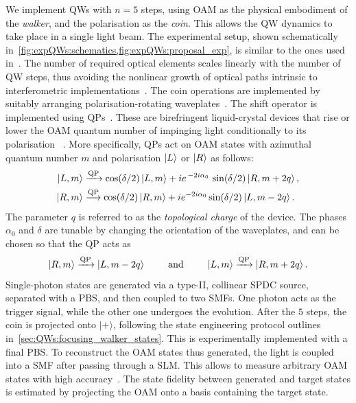 We implement \acp{QW} with $n=5$ steps, using \ac{OAM} as the physical embodiment of the \emph{walker}, and the polarisation as the \emph{coin}. This allows the QW dynamics to take place in a single light beam.
The experimental setup, shown schematically in~\cref{fig:expQWs:schematics,fig:expQWs:proposal_exp}, is similar to the ones used in~\cite{cardano2015quantum,cardano2016statistical}.
The number of required optical elements scales linearly with the number of QW steps, thus avoiding the nonlinear growth of optical paths intrinsic to interferometric implementations~\cite{zhang2010implementation,goyal2013implementing}.
The coin operations are implemented by suitably arranging polarisation-rotating waveplates~\cite{simon1990minimal}. The shift operator is implemented using \acp{QP}~\cite{marrucci2006optical}. These are birefringent liquid-crystal devices that rise or lower the \ac{OAM} quantum number of impinging light conditionally to its polarisation ~\cite{marrucci2006optical}. More specifically, \acp{QP} act on \ac{OAM} states with azimuthal quantum number $m$ and polarisation $\ket L$ or $\ket R$ as follows:
\begin{equation}
\begin{aligned}
	\ket{L,m} & \xrightarrow{\text{QP}} \cos(\delta/2) \ket{L,m}
				+ i e^{\,-2 i \alpha_0}\, \sin(\delta/2) \ket{R,m+2q}, \\
	\ket{R,m} & \stackrel{\text{QP}}{\longrightarrow} \cos(\delta/2) \ket{R,m}
				+ i e^{-2 i \alpha_0} \sin(\delta/2) \ket{L,m-2q}.
\end{aligned}
\end{equation}
The parameter $q$ is referred to as the \emph{topological charge} of the device.
The phases $\alpha_0$ and $\delta$ are tunable by changing the orientation of the waveplates, and can be chosen so that the QP acts as
\begin{equation}
	\ket{R,m}\xrightarrow{\text{QP}} \ket{L,m-2q}
	\qquad\text{ and }\qquad
	\ket{L,m}\xrightarrow{\text{QP}}\ket{R,m+2q}.
\end{equation}
Single-photon states are generated via a type-II, collinear \ac{SPDC} source, separated with a \ac{PBS}, and then coupled to two \acp{SMF}. One photon acts as the trigger signal, while the other one undergoes the evolution.
After the $5$ steps, the coin is projected onto $|+\rangle$, following the state engineering protocol outlines in~\cref{sec:QWs:focusing_walker_states}. This is experimentally implemented with a final \ac{PBS}.
To reconstruct the \ac{OAM} states thus generated, the light is coupled into a \ac{SMF} after passing through a \ac{SLM}. This allows to measure arbitrary \ac{OAM} states with high accuracy~\cite{bolduc2013exact,dambrosio2013test}.
The state fidelity between generated and target states is estimated by projecting the \ac{OAM} onto a basis containing the target state.

